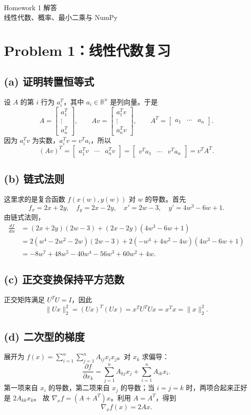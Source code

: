 \documentclass[11pt,UTF8,fontset=windows]{ctexart}
\newcommand{\R}{\mathbb R}
\begin{document}
\begin{center}{\LARGE Homework 1 解答}\\[5pt]线性代数、概率、最小二乘与 NumPy\end{center}
\section*{Problem 1：线性代数复习}
\subsection*{(a) 证明转置恒等式}
设 $A$ 的第 $i$ 行为 $a_i^T$，其中 $a_i\in\R^n$ 是列向量。于是
\[
 A=\begin{bmatrix}a_1^T\\\vdots\\a_n^T\end{bmatrix},\qquad
 Av=\begin{bmatrix}a_1^Tv\\\vdots\\a_n^Tv\end{bmatrix},\qquad
 A^T=\begin{bmatrix}a_1&\cdots&a_n\end{bmatrix}.
\]
因为 $a_i^Tv$ 为实数，$a_i^Tv=v^Ta_i$，所以
\[
 (Av)^T=\begin{bmatrix}a_1^Tv&\cdots&a_n^Tv\end{bmatrix}
 =\begin{bmatrix}v^Ta_1&\cdots&v^Ta_n\end{bmatrix}
 =\boxed{v^TA^T}.
\]
\subsection*{(b) 链式法则}
这里求的是复合函数 $f(x(w),y(w))$ 对 $w$ 的导数。首先
\[
 f_x=2x+2y,\quad f_y=2x-2y,\quad x'=2w-3,\quad y'=4w^3-6w+1.
\]
由链式法则，
\begin{align*}
 \frac{df}{dw}
 &=(2x+2y)(2w-3)+(2x-2y)(4w^3-6w+1)\\
 &=2(w^4-2w^2-2w)(2w-3)
   +2(-w^4+4w^2-4w)(4w^3-6w+1)\\
 &=\boxed{-8w^7+48w^5-40w^4-56w^3+60w^2+4w}.
\end{align*}
\subsection*{(c) 正交变换保持平方范数}
正交矩阵满足 $U^TU=I$，因此
\[
 \|Ux\|_2^2=(Ux)^T(Ux)=x^TU^TUx=x^Tx=\boxed{\|x\|_2^2}.
\]
\subsection*{(d) 二次型的梯度}
展开为 $f(x)=\sum_{i=1}^n\sum_{j=1}^n A_{ij}x_ix_j$。对 $x_k$ 求偏导：
\[
 \frac{\partial f}{\partial x_k}
 =\sum_{j=1}^n A_{kj}x_j+\sum_{i=1}^n A_{ik}x_i.
\]
第一项来自 $x_i$ 的导数，第二项来自 $x_j$ 的导数；当 $i=j=k$ 时，两项合起来正好是 $2A_{kk}x_k$。
故 $\nabla_x f=(A+A^T)x$。利用 $A=A^T$，得到
\[\boxed{\nabla_x f(x)=2Ax}.\]
\newpage
\end{document}
